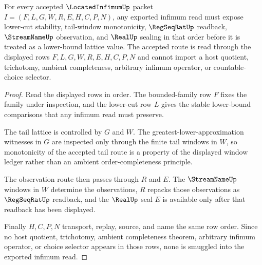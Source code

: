 \begin{theorem}
\label{thm:located-infimum-obligation-tail-lattice}
For every accepted $\LocatedInfimumUp$ packet $I=(F,L,G,W,R,E,H,C,P,N)$, any exported infimum read must expose lower-cut stability, tail-window monotonicity, $\RegSeqRatUp$ readback, $\StreamNameUp$ observation, and $\RealUp$ sealing in that order before it is treated as a lower-bound lattice value. The accepted route is read through the displayed rows $F,L,G,W,R,E,H,C,P,N$ and cannot import a host quotient, trichotomy, ambient completeness, arbitrary infimum operator, or countable-choice selector.
\end{theorem}
\begin{proof}
Read the displayed rows in order. The bounded-family row $F$ fixes the family under inspection, and the lower-cut row $L$ gives the stable lower-bound comparisons that any infimum read must preserve.

The tail lattice is controlled by $G$ and $W$. The greatest-lower-approximation witnesses in $G$ are inspected only through the finite tail windows in $W$, so monotonicity of the accepted tail route is a property of the displayed window ledger rather than an ambient order-completeness principle.

The observation route then passes through $R$ and $E$. The $\StreamNameUp$ windows in $W$ determine the observations, $R$ repacks those observations as $\RegSeqRatUp$ readback, and the $\RealUp$ seal $E$ is available only after that readback has been displayed.

Finally $H,C,P,N$ transport, replay, source, and name the same row order. Since no host quotient, trichotomy, ambient completeness theorem, arbitrary infimum operator, or choice selector appears in those rows, none is smuggled into the exported infimum read.
\end{proof}

